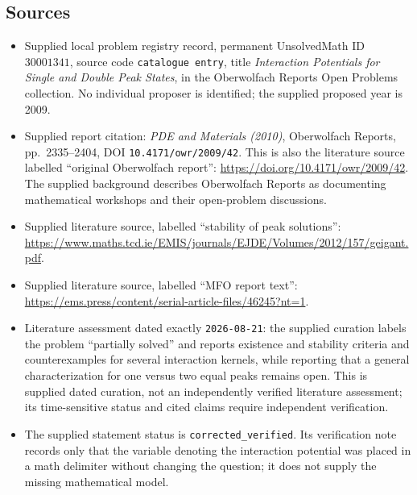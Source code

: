 \documentclass[11pt]{article}
\begin{document}
\subsection{Sources}
\begin{itemize}
\item Supplied local problem registry record, permanent UnsolvedMath ID \(30001341\), source code \texttt{catalogue entry}, title \emph{Interaction Potentials for Single and Double Peak States}, in the Oberwolfach Reports Open Problems collection. No individual proposer is identified; the supplied proposed year is 2009.
\item Supplied report citation: \emph{PDE and Materials (2010)}, Oberwolfach Reports, pp.\ 2335--2404, DOI \texttt{10.4171/owr/2009/42}. This is also the literature source labelled ``original Oberwolfach report'': \url{https://doi.org/10.4171/owr/2009/42}. The supplied background describes Oberwolfach Reports as documenting mathematical workshops and their open-problem discussions.
\item Supplied literature source, labelled ``stability of peak solutions'': \url{https://www.maths.tcd.ie/EMIS/journals/EJDE/Volumes/2012/157/geigant.pdf}.
\item Supplied literature source, labelled ``MFO report text'': \url{https://ems.press/content/serial-article-files/46245?nt=1}.
\item Literature assessment dated exactly \texttt{2026-08-21}: the supplied curation labels the problem ``partially solved'' and reports existence and stability criteria and counterexamples for several interaction kernels, while reporting that a general characterization for one versus two equal peaks remains open. This is supplied dated curation, not an independently verified literature assessment; its time-sensitive status and cited claims require independent verification.
\item The supplied statement status is \texttt{corrected\_verified}. Its verification note records only that the variable denoting the interaction potential was placed in a math delimiter without changing the question; it does not supply the missing mathematical model.
\end{itemize}
\end{document}
